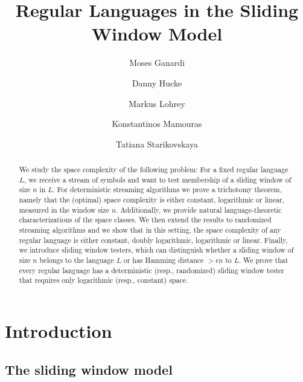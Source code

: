 \documentclass{article}\usepackage[a4paper,margin=20mm]{geometry}
\title{Regular Languages in the Sliding Window Model}
\author{Moses Ganardi \and Danny Hucke \and Markus Lohrey \and Konstantinos Mamouras \and Tatiana Starikovskaya}\date{}
\begin{document}
\maketitle

\begin{abstract}
We study the space complexity of the following problem:
For a fixed regular language $L$, we receive a stream of symbols and want to test membership of a sliding window of size $n$ in $L$.
For deterministic streaming algorithms we prove a trichotomy theorem,
namely that the (optimal) space complexity is either constant, logarithmic or linear,
measured in the window size $n$.
Additionally, we provide natural language-theoretic characterizations
of the space classes.
We then extend the results to randomized streaming algorithms and we show that in this setting, the space complexity of any regular language is either constant, doubly logarithmic, logarithmic or linear.
Finally, we introduce sliding window testers, which can distinguish
whether a sliding window of size $n$ belongs to the language $L$ or
has Hamming distance $> \epsilon n$ to $L$.
We prove that every regular language has a deterministic (resp., randomized) sliding window tester
that requires only logarithmic (resp., constant) space.
\end{abstract}






\section{Introduction}

\subsection{The sliding window model}
\end{document}
